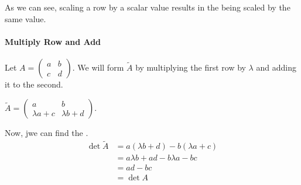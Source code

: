 As we can see, scaling a row by a scalar value results in the  being scaled by the same value.

\paragraph{Multiply Row and Add}
Let $A =
\begin{pmatrix}
  a & b \\
  c & d
\end{pmatrix}$.
We will form $\tilde{A}$ by multiplying the first row by $\lambda$ and adding it to the second.

$\tilde{A} =
\begin{pmatrix}
  a & b \\
  \lambda a + c & \lambda b + d
\end{pmatrix}$.

Now, jwe can find the .
\begin{align*}
  \det \tilde{A} &= a(\lambda b + d) - b(\lambda a + c) \\
                 &= a \lambda b + ad - b \lambda a - bc \\
                 &=  ad - bc \\
                 &= \det A
\end{align*}


